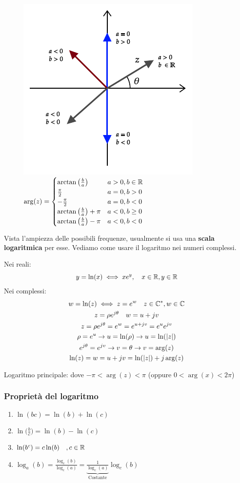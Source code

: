 \begin{figure}[H]
	\centering
	\includegraphics[width=0.4\linewidth, valign=c]{immagini/cap6_Bode/argCompl.pdf}\quad
	$ \displaystyle \arg(z) =
	\begin{cases}
		\arctan \big(\frac{b}{a}\big) &a>0, b\in \mathbb{R}\\
		\frac{\pi}{2}&a=0, b>0\\
		-\frac{\pi}{2}&a=0, b<0\\
		\arctan \big(\frac{b}{a}\big)+\pi &a<0, b\ge 0\\
		\arctan \big(\frac{b}{a}\big)-\pi &a<0, b< 0
	\end{cases} $
\end{figure}

Vista l'ampiezza delle possibili frequenze, usualmente si usa una \textbf{scala logaritmica} per esse. Vediamo come usare il logaritmo nei numeri complessi.

Nei reali: 
\begin{equation*}
	y=\ln (x) \iff x e^y, \quad x \in \mathbb{R}, y \in \mathbb{R} 
\end{equation*}
Nei complessi: %
\begin{gather*}
	w = \ln (z) \iff z=e^w \quad z \in \mathbb{C}^*, w \in \mathbb{C} \\
	z=\rho e^{j \theta} \quad w=u+jv\\
	z= \rho e^{j \theta} = e^w=e^{u+jv} = e^u e^{jv}\\
	\rho = e^u \rightarrow u = \ln(\rho) \rightarrow u =\ln(\lvert z\rvert)\\
	e^{j\theta} = e^{jv} \rightarrow v = \theta \rightarrow v= \arg (z)\\
	\ln (z) = w = u+jv = \ln (\lvert z\rvert) + j \arg (z)
\end{gather*}

Logaritmo principale: dove $ -\pi < \arg (z) < \pi $ (oppure $ 0< \arg (x) <2\pi $)

\subsubsection{Proprietà del logaritmo}
\begin{enumerate}
	\item $ \ln ( b c) = \ln (b) + \ln (c) $
	\item $ \ln \Big(\frac{b}{c}\Big) = \ln (b) - \ln (c) $
	\item $ \ln (b^c) = c \ln (b) \quad ,c \in \mathbb{R}$
	\item $ \log_a (b)  = \frac{\log_c (b)}{\log_c (a)}=\underbrace{\frac{1}{\log_c (a)}}_{\text{Costante}}\log_c (b)$
\end{enumerate}

